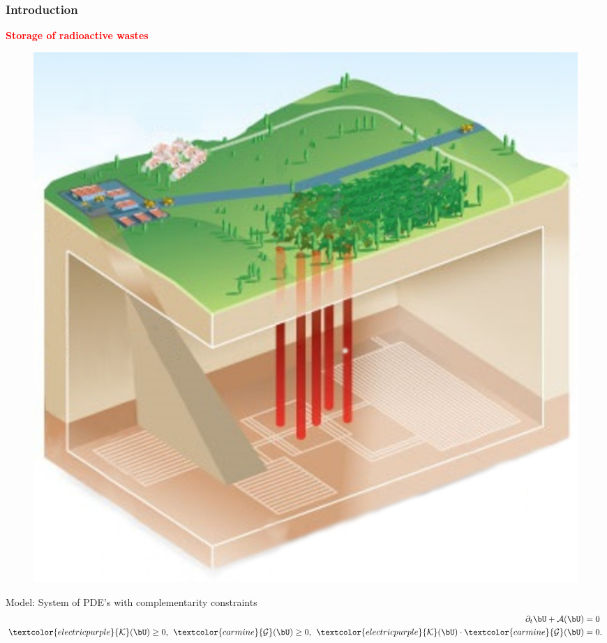 \documentclass[10 pt]{beamer}
\begin{document}
\begin{frame}
\frametitle{Introduction}
\hspace*{0.2 cm} \textcolor{red}{\textbf{Storage of radioactive wastes}}

\begin{minipage}{0.45 \linewidth}
\begin{figure}
\includegraphics[scale=0.65]{stockage_dechets_radioactifs_sans_texte}
\end{figure}
\end{minipage}
\hfill
\begin{minipage}{0.53 \linewidth}
Model: System of PDE's with complementarity constraints
\begin{equation*}
\begin{split}
\partial_t \bU + \mathcal{A}(\bU)& {}= 0\\
\textcolor{electricpurple}{\mathcal{K}}(\bU) \geq 0, \hspace{0.15 cm} \textcolor{carmine}{\mathcal{G}}(\bU) \geq 0, \hspace{0.15 cm} \textcolor{electricpurple}{\mathcal{K}}(\bU) \cdot \textcolor{carmine}{\mathcal{G}}(\bU) &= 0.
\end{split}

\end{equation*}
\end{minipage}
\end{frame}
\end{document}

